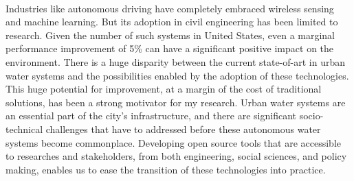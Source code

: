 \

\noindent Industries like autonomous driving have completely embraced wireless sensing and machine learning. 
But its adoption in civil engineering has been limited to research.
Given the number of such systems in United States, even a marginal performance improvement of 5\% can have a significant positive impact on the environment.
There is a huge disparity between the current state-of-art in urban water systems and the possibilities enabled by the adoption of these technologies.
This huge potential for improvement, at a margin of the cost of traditional solutions, has been a strong motivator for my research.
Urban water systems are an essential part of the city's infrastructure, and there are significant socio-technical challenges that have to addressed before these autonomous water systems become commonplace. 
Developing open source tools that are accessible to researches and stakeholders, from both engineering, social sciences, and policy making, enables us to ease the transition of these technologies into practice.

